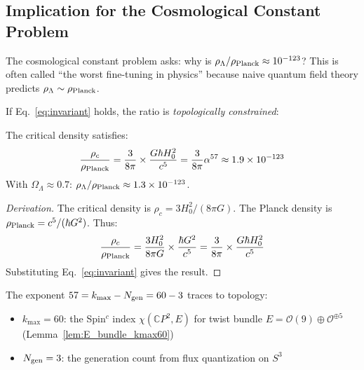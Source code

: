 \subsection{Implication for the Cosmological Constant Problem}

The cosmological constant problem asks: why is $\rho_\Lambda / \rho_{\rm Planck} \approx 10^{-123}$? This is often called ``the worst fine-tuning in physics'' because naive quantum field theory predicts $\rho_\Lambda \sim \rho_{\rm Planck}$.

If Eq.~\eqref{eq:invariant} holds, the ratio is \textit{topologically constrained}:

\begin{proposition}\label{prop:CC-scaling}
The critical density satisfies:
\begin{equation}
\frac{\rho_c}{\rho_{\rm Planck}} = \frac{3}{8\pi} \times \frac{G\hbar H_0^2}{c^5} = \frac{3}{8\pi}\alpha^{57} \approx 1.9 \times 10^{-123}
\label{eq:CC-solution}
\end{equation}
With $\Omega_\Lambda \approx 0.7$: $\rho_\Lambda/\rho_{\rm Planck} \approx 1.3 \times 10^{-123}$.
\end{proposition}

\begin{proof}[Derivation]
The critical density is $\rho_c = 3H_0^2/(8\pi G)$. The Planck density is $\rho_{\rm Planck} = c^5/(\hbar G^2)$. Thus:
\begin{equation}
\frac{\rho_c}{\rho_{\rm Planck}} = \frac{3H_0^2}{8\pi G} \times \frac{\hbar G^2}{c^5} = \frac{3}{8\pi} \times \frac{G\hbar H_0^2}{c^5}
\end{equation}
Substituting Eq.~\eqref{eq:invariant} gives the result.
\end{proof}

The exponent $57 = k_{\max} - N_{\rm gen} = 60 - 3$ traces to topology:
\begin{itemize}
\item $k_{\max} = 60$: the Spin$^c$ index $\chi(\mathbb{C}P^2, E)$ for twist bundle $E = \mathcal{O}(9) \oplus \mathcal{O}^{\oplus 5}$ (Lemma~\ref{lem:E_bundle_kmax60})
\item $N_{\rm gen} = 3$: the generation count from flux quantization on $S^3$
\end{itemize}

